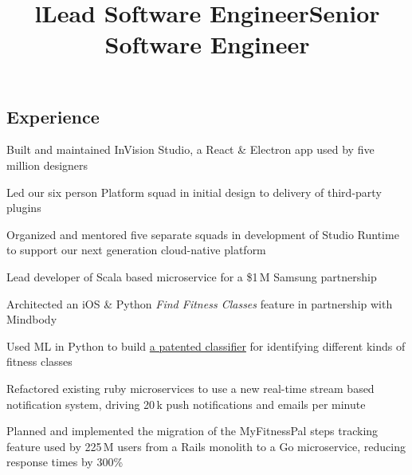 \documentclass[12pt, tweaklist, line]{res}
\title{l}\dates{r}\\
\let\tempone\itemize
\let\temptwo\enditemize
\renewenvironment{itemize}{\tempone\vspace{-.15in}\setlength{\topsep}{0pt}\setlength{\itemsep}{3pt}\vspace{-.15in}}{\temptwo}
\begin{document}

\begin{resume}

\section{Experience}

\title{Lead Software Engineer}
\begin{position}
\begin{itemize}
\item Built and maintained InVision Studio, a React \& Electron app used by five million designers
\item Led our six person Platform squad in initial design to delivery of third-party plugins
\item Organized and mentored five separate squads in development of Studio Runtime to support our next generation cloud-native platform
\end{itemize}
\end{position}

\title{Senior Software Engineer}
\begin{position}
\begin{itemize}
\item Lead developer of Scala based microservice for a \$1\,M Samsung partnership
\item Architected an iOS \& Python \textit{Find Fitness Classes} feature in partnership with Mindbody
\item Used ML in Python to build \href{https://patents.google.com/patent/US20180225367A1/en?oq=20180225367}{a patented classifier} for identifying different kinds of fitness classes
\item Refactored existing ruby microservices to use a new real-time stream based notification system, driving 20\,k push notifications and emails per minute
\item Planned and implemented the migration of the MyFitnessPal steps tracking feature used by 225\,M users from a Rails monolith to a Go microservice, reducing response times by 300\%
\end{itemize}
\end{position}


\end{resume}
\end{document}
